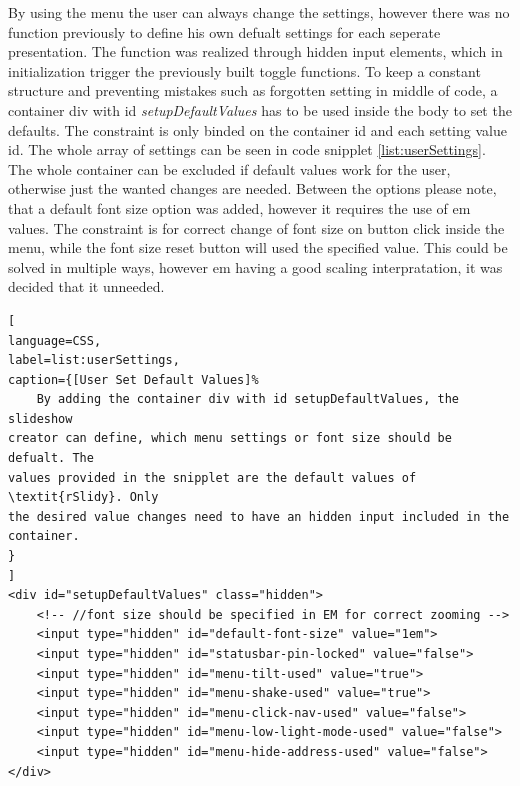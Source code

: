 By using the menu the user can always change the settings, however there was no 
function previously to define his own defualt settings for each seperate 
presentation. The function was realized through hidden input elements, which in 
initialization trigger the previously built toggle functions. To keep a 
constant structure and preventing mistakes such as forgotten setting in middle 
of code, a container div with id \textit{setupDefaultValues} has to be used 
inside the body to set the defaults. The constraint is only binded on the 
container id and each setting value id. The whole array of settings can be seen 
in code snipplet \ref{list:userSettings}. The whole container can be excluded 
if default values work for the user, otherwise just the wanted changes are 
needed. Between the options please note, that a default font size option was 
added, however it requires the use of em values. The constraint is for correct 
change of font size on button click inside the menu, while the font size reset 
button will used the specified value. This could be solved in multiple ways, 
however em having a good scaling interpratation, it was decided that it 
unneeded.

\begin{minipage}{\linewidth}
\begin{lstlisting}[
language=CSS,
label=list:userSettings,
caption={[User Set Default Values]%
	By adding the container div with id setupDefaultValues, the slideshow 
creator can define, which menu settings or font size should be defualt. The 
values provided in the snipplet are the default values of \textit{rSlidy}. Only 
the desired value changes need to have an hidden input included in the 
container. 
}
]
<div id="setupDefaultValues" class="hidden">
	<!-- //font size should be specified in EM for correct zooming -->
	<input type="hidden" id="default-font-size" value="1em">
	<input type="hidden" id="statusbar-pin-locked" value="false">
	<input type="hidden" id="menu-tilt-used" value="true">
	<input type="hidden" id="menu-shake-used" value="true">
	<input type="hidden" id="menu-click-nav-used" value="false">
	<input type="hidden" id="menu-low-light-mode-used" value="false">
	<input type="hidden" id="menu-hide-address-used" value="false">
</div>
\end{lstlisting}
\end{minipage}


